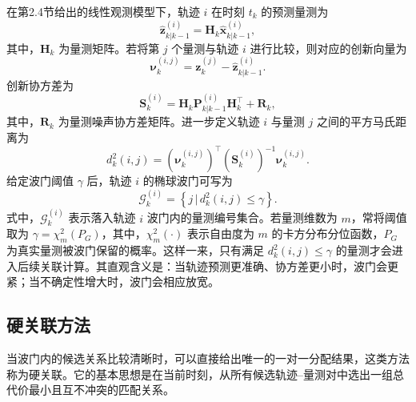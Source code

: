 \documentclass{xdupgthesis}
\begin{document}
在第2.4节给出的线性观测模型下，轨迹 $i$ 在时刻 $t_k$ 的预测量测为
\begin{equation}
	\hat{\mathbf{z}}^{(i)}_{k|k-1}=\mathbf{H}_k\hat{\mathbf{x}}^{(i)}_{k|k-1},
\end{equation}
其中，$\mathbf{H}_k$ 为量测矩阵。若将第 $j$ 个量测与轨迹 $i$ 进行比较，则对应的创新向量为
\begin{equation}
	\boldsymbol{\nu}^{(i,j)}_k
	=
	\mathbf{z}^{(j)}_k-\hat{\mathbf{z}}^{(i)}_{k|k-1}.
\end{equation}
创新协方差为
\begin{equation}
	\mathbf{S}^{(i)}_k
	=
	\mathbf{H}_k\mathbf{P}^{(i)}_{k|k-1}\mathbf{H}_k^{\top}+\mathbf{R}_k,
\end{equation}
其中，$\mathbf{R}_k$ 为量测噪声协方差矩阵。进一步定义轨迹 $i$ 与量测 $j$ 之间的平方马氏距离为
\begin{equation}
	d_k^2(i,j)
	=
	\left(\boldsymbol{\nu}^{(i,j)}_k\right)^{\top}
	\left(\mathbf{S}^{(i)}_k\right)^{-1}
	\boldsymbol{\nu}^{(i,j)}_k.
\end{equation}
给定波门阈值 $\gamma$ 后，轨迹 $i$ 的椭球波门可写为
\begin{equation}
	\mathcal{G}^{(i)}_k
	=
	\left\{
	j\,\big|\, d_k^2(i,j)\le \gamma
	\right\}.
\end{equation}
式中，$\mathcal{G}^{(i)}_k$ 表示落入轨迹 $i$ 波门内的量测编号集合。若量测维数为 $m$，常将阈值取为 $\gamma=\chi_m^2(P_G)$，其中，$\chi_m^2(\cdot)$ 表示自由度为 $m$ 的卡方分布分位函数，$P_G$ 为真实量测被波门保留的概率。这样一来，只有满足 $d_k^2(i,j)\le \gamma$ 的量测才会进入后续关联计算。其直观含义是：当轨迹预测更准确、协方差更小时，波门会更紧；当不确定性增大时，波门会相应放宽。

\subsection{硬关联方法}

当波门内的候选关系比较清晰时，可以直接给出唯一的一对一分配结果，这类方法称为硬关联。它的基本思想是在当前时刻，从所有候选轨迹--量测对中选出一组总代价最小且互不冲突的匹配关系。
\end{document}
